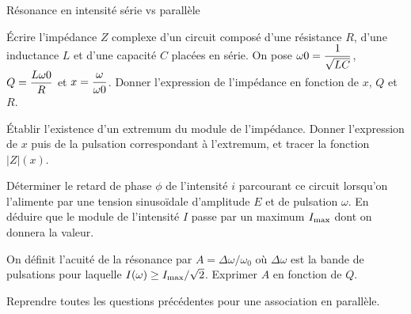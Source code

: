 \begin{exo}[MPSI]{Résonance en intensité série vs parallèle}

\begin{quest}
\item Écrire l’impédance $Z$ complexe d’un circuit composé d’une résistance $R$, d’une inductance $L$ et
d’une capacité $C$ placées en série. On pose $\omega\-0 = \dfrac{1}{\sqrt{LC}}$, $Q = \dfrac{L\omega\-0}{R}$ et $x = \dfrac{\omega}{\omega\-0}$.
Donner l’expression de l’impédance en fonction de $x$, $Q$ et $R$.




\item Établir l’existence d’un extremum du module de l’impédance. Donner l’expression de $x$ puis de la pulsation correspondant à l’extremum, et tracer la fonction $|Z|(x)$.




\item Déterminer le retard de phase $\phi$ de l’intensité $i$ parcourant ce circuit lorsqu’on l’alimente
par une tension sinusoïdale d’amplitude $E$ et de pulsation $\omega$. En déduire que le module de l’intensité $I$ passe par un maximum $I_{\rm max}$ dont on donnera la valeur.



\item On définit l’acuité de la résonance par $A = \Delta \omega/\omega_0$
 où $\Delta \omega$ est la bande de pulsations pour laquelle $I(\omega)  \geq I_{\rm max}/\sqrt{2}$. Exprimer $A$ en fonction de $Q$.



\item Reprendre toutes les questions précédentes pour une association en parallèle.


\end{quest}


\end{exo}


